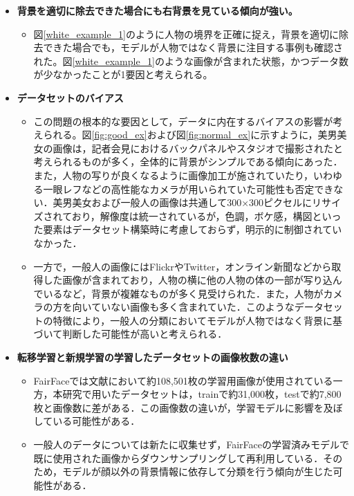 \documentclass[a4paper,11pt,titlepage]{jsarticle}
\begin{document}
\begin{itemize}
  \item \textbf{背景を適切に除去できた場合にも右背景を見ている傾向が強い。}
  \begin{itemize}
  \item 図\ref{white_example_1}のように人物の境界を正確に捉え，背景を適切に除去できた場合でも，モデルが人物ではなく背景に注目する事例も確認された。図\ref{white_example_1}のような画像が含まれた状態，かつデータ数が少なかったことが1要因と考えられる。
  \end{itemize}
  \item \textbf{データセットのバイアス}
    \begin{itemize}
      \item この問題の根本的な要因として，データに内在するバイアスの影響が考えられる。図\ref{fig:good_ex}および図\ref{fig:normal_ex}に示すように，美男美女の画像は，記者会見におけるバックパネルやスタジオで撮影されたと考えられるものが多く，全体的に背景がシンプルである傾向にあった．また，人物の写りが良くなるように画像加工が施されていたり，いわゆる一眼レフなどの高性能なカメラが用いられていた可能性も否定できない．美男美女および一般人の画像は共通して300×300ピクセルにリサイズされており，解像度は統一されているが，色調，ボケ感，構図といった要素はデータセット構築時に考慮しておらず，明示的に制御されていなかった．
      \item 一方で，一般人の画像にはFlickrやTwitter，オンライン新聞などから取得した画像が含まれており，人物の横に他の人物の体の一部が写り込んでいるなど，背景が複雑なものが多く見受けられた．また，人物がカメラの方を向いていない画像も多く含まれていた．このようなデータセットの特徴により，一般人の分類においてモデルが人物ではなく背景に基づいて判断した可能性が高いと考えられる．
    \end{itemize}
    \item \textbf{転移学習と新規学習の学習したデータセットの画像枚数の違い}
  \begin{itemize}
    \item FairFaceでは文献\cite{karkkainenFairFace}において約108,501枚の学習用画像が使用されている一方，本研究で用いたデータセットは，trainで約31,000枚，testで約7,800枚と画像数に差がある．この画像数の違いが，学習モデルに影響を及ぼしている可能性がある．
    \item 一般人のデータについては新たに収集せず，FairFaceの学習済みモデルで既に使用された画像からダウンサンプリングして再利用している．そのため，モデルが顔以外の背景情報に依存して分類を行う傾向が生じた可能性がある．
  \end{itemize}
\end{itemize}
\end{document}
